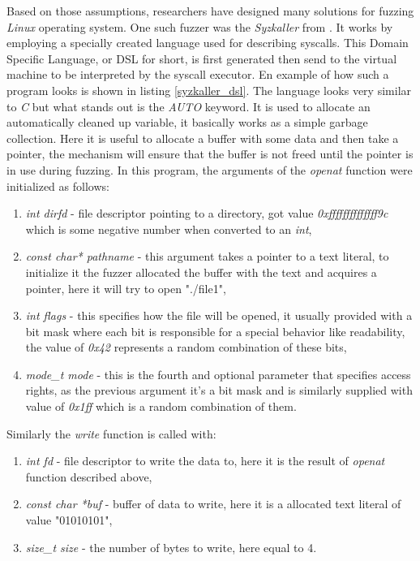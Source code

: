 Based on those assumptions, researchers have designed many solutions for fuzzing \textit{Linux} operating system. One such fuzzer was the \textit{Syzkaller} from \cite{syzkaller}. It works by employing a specially created language used for describing syscalls. This Domain Specific Language, or DSL for short, is first generated then send to the virtual machine to be interpreted by the syscall executor. En example of how such a program looks is shown in listing \ref{syzkaller_dsl}. The language looks very similar to \textit{C} but what stands out is the \textit{AUTO} keyword. It is used to allocate an automatically cleaned up variable, it basically works as a simple garbage collection. Here it is useful to allocate a buffer with some data and then take a pointer, the mechanism will ensure that the buffer is not freed until the pointer is in use during fuzzing. In this program, the arguments of the \textit{openat} function were initialized as follows:
\begin{enumerate}
    \item \textit{int dirfd} - file descriptor pointing to a directory, got value \textit{0xffffffffffffff9c} which is some negative number when converted to an \textit{int},
    \item \textit{const char* pathname} - this argument takes a pointer to a text literal, to initialize it the fuzzer allocated the buffer with the text and acquires a pointer, here it will try to open "./file1",
    \item \textit{int flags} - this specifies how the file will be opened, it usually provided with a bit mask where each bit is responsible for a special behavior like readability, the value of \textit{0x42} represents a random combination of these bits,
    \item \textit{mode\_t mode} - this is the fourth and optional parameter that specifies access rights, as the previous argument it's a bit mask and is similarly supplied with value of \textit{0x1ff} which is a random combination of them.
\end{enumerate}
Similarly the \textit{write} function is called with:
\begin{enumerate}
    \item \textit{int fd} - file descriptor to write the data to, here it is the result of \textit{openat} function described above,
    \item \textit{const char *buf} - buffer of data to write, here it is a allocated text literal of value "01010101",
    \item \textit{size\_t size} - the number of bytes to write, here equal to 4.
\end{enumerate}

